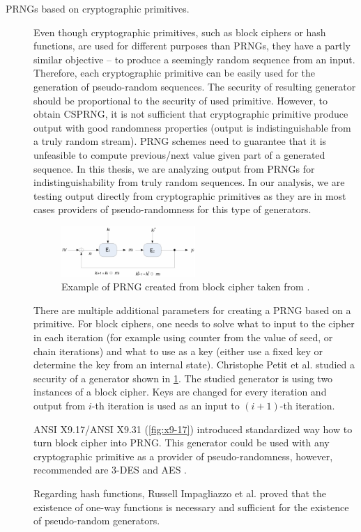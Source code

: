 \documentclass[
    digital,    %
    oneside,    %
    color,
    11pt,
    nocover,
    notable,
    nolof,
    nolot,
    final
]{fithesis3}
\renewcommand\_{\textunderscore\allowbreak}
\begin{document}
\begin{description}
\item[PRNGs based on cryptographic primitives.] Even though cryptographic primitives, such as block ciphers or hash functions, are used for different purposes than PRNGs, they have a partly similar objective -- to produce a seemingly random sequence from an input. Therefore, each cryptographic primitive can be easily used for the generation of pseudo-random sequences. The security of resulting generator should be proportional to the security of used primitive. However, to obtain CSPRNG, it is not sufficient that cryptographic primitive produce output with good randomness properties (output is indistinguishable from a truly random stream). PRNG schemes need to guarantee that it is unfeasible to compute previous/next value given part of a generated sequence. In this thesis, we are analyzing output from PRNGs for indistinguishability from truly random sequences. In our analysis, we are testing output directly from cryptographic primitives as they are in most cases providers of pseudo-randomness for this type of generators.

\begin{figure}[h]
	\centering
	\includegraphics[width=0.5\textwidth]{./images/pictures/block-cipher-prng.png}
	\caption{Example of PRNG created from block cipher taken from \cite{Petit:2008:BCB:1368310.1368322}.}
	\label{fig:block-prng}
\end{figure}

There are multiple additional parameters for creating a PRNG based on a primitive. For block ciphers, one needs to solve what to input to the cipher in each iteration (for example using counter from the value of seed, or chain iterations) and what to use as a key (either use a fixed key or determine the key from an internal state). Christophe Petit et al. studied \cite{Petit:2008:BCB:1368310.1368322} a security of a generator shown in \cref{fig:block-prng}. The studied generator is using two instances of a block cipher. Keys are changed for every iteration and output from $i$-th iteration is used as an input to $(i + 1)$-th iteration.

ANSI X9.17/ANSI X9.31 (\cref{fig:x9-17}) \cite{ansi1985american} introduced standardized way how to turn block cipher into PRNG. This generator could be used with any cryptographic primitive as a provider of pseudo-randomness, however, recommended are 3-DES and AES \cite{Keller05nist-recommendedrandom}.

Regarding hash functions, Russell Impagliazzo et al. proved \cite{Impagliazzo:1989:PGO:73007.73009} that the existence of one-way functions is necessary and sufficient for the existence of pseudo-random generators. 

\end{description} 
\end{document}
